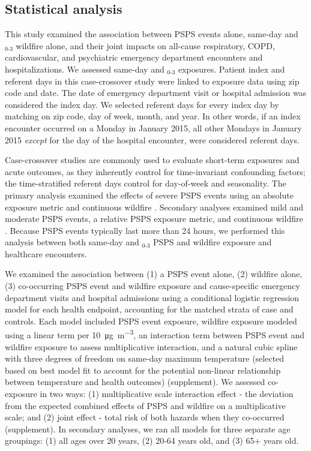 \documentclass[../main.tex]{subfiles}
\begin{document}
\subsection{Statistical analysis}
This study examined the association between PSPS events alone, same-day and $_{0\text{-}3}$ wildfire \PM alone, and their joint impacts on all-cause respiratory, COPD, cardiovascular, and psychiatric emergency department encounters and hospitalizations. We assessed same-day and $_{0\text{-}3}$ exposures. Patient index and referent days in this case-crossover study were linked to exposure data using zip code and date. The date of emergency department visit or hospital admission was considered the index day. We selected referent days for every index day by matching on zip code, day of week, month, and year. In other words, if an index encounter occurred on a Monday in January 2015, all other Mondays in January 2015 \textit{except} for the day of the hospital encounter, were considered referent days.

Case-crossover studies are commonly used to evaluate short-term exposures and acute outcomes, as they inherently control for time-invariant confounding factors; the time-stratified referent days control for day-of-week and seasonality.\citep{lumley2000bias} The primary analysis examined the effects of severe PSPS events using an absolute exposure metric and continuous wildfire \PM. Secondary analyses examined mild and moderate PSPS events, a relative PSPS exposure metric, and continuous wildfire \PM. Because PSPS events typically last more than 24 hours, we performed this analysis between both same-day and $_{0\text{-}3}$ PSPS and wildfire \PM exposure and healthcare encounters.

We examined the association between (1) a PSPS event alone, (2) wildfire \PM alone, (3) co-occurring PSPS event and wildfire \PM exposure and cause-specific emergency department visits and hospital admissions using a conditional logistic regression model for each health endpoint, accounting for the matched strata of case and controls. Each model included PSPS event exposure, wildfire \PM exposure modeled using a linear term per \SI[per-mode=symbol]{10}{\micro\gram\per\cubic\metre}, an interaction term between PSPS event and wildfire \PM exposure to assess multiplicative interaction, and a natural cubic spline with three degrees of freedom on same-day maximum temperature (selected based on best model fit to account for the potential non-linear relationship between temperature and health outcomes) (supplement). We assessed co-exposure in two ways: (1) multiplicative scale interaction effect - the deviation from the expected combined effects of PSPS and wildfire \PM on a multiplicative scale; and (2) joint effect - total risk of both hazards when they co-occurred (supplement). In secondary analyses, we ran all models for three separate age groupings: (1) all ages over 20 years, (2) 20-64 years old, and (3) 65+ years old. 
\end{document}
